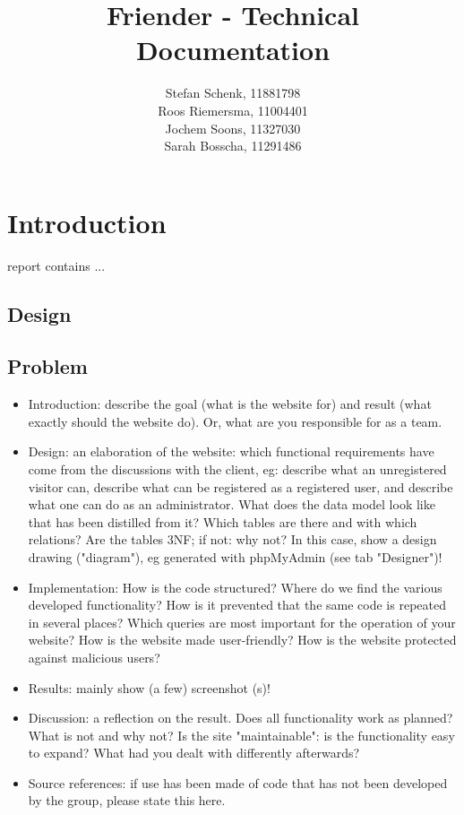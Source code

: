 \documentclass[journal]{IEEEtran}
\begin{document}
\title{Friender - Technical Documentation}
\author{Stefan Schenk, 11881798\\
Roos Riemersma, 11004401\\
Jochem Soons, 11327030\\
Sarah Bosscha, 11291486}



\maketitle

\section{Introduction}
 report contains ...


\subsection{Design}
\label{subsec:design}

\subsection{Problem}
\label{subsec:problem}

\begin{itemize}
	\item Introduction: describe the goal (what is the website for) and result (what exactly should the website do). Or, what are you responsible for as a team.
	\item Design: an elaboration of the website: which functional requirements have come from the discussions with the client, eg: describe what an unregistered visitor can, describe what can be registered as a registered user, and describe what one can do as an administrator. What does the data model look like that has been distilled from it? Which tables are there and with which relations? Are the tables 3NF; if not: why not? In this case, show a design drawing ("diagram"), eg generated with phpMyAdmin (see tab "Designer")!
	\item Implementation: How is the code structured? Where do we find the various developed functionality? How is it prevented that the same code is repeated in several places? Which queries are most important for the operation of your website? How is the website made user-friendly? How is the website protected against malicious users?
	\item Results: mainly show (a few) screenshot (s)!
	\item Discussion: a reflection on the result. Does all functionality work as planned? What is not and why not? Is the site "maintainable": is the functionality easy to expand? What had you dealt with differently afterwards?
	\item Source references: if use has been made of code that has not been developed by the group, please state this here.
\end{itemize}
\end{document}
